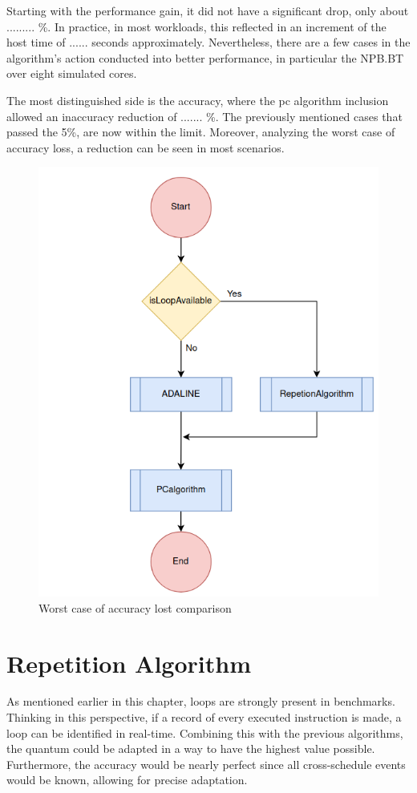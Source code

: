 Starting with the performance gain, it did not have a significant drop, only about  ......... \%. In practice, in most workloads, this 
reflected in an increment of the host time of ...... seconds approximately. Nevertheless, there are a few cases in the algorithm's action 
conducted into better performance, in particular the NPB.BT over eight simulated cores. 

The most distinguished side is the accuracy, where the \gls{pc} algorithm inclusion allowed an inaccuracy reduction of ....... \%. The 
previously mentioned cases that passed the 5\%, are now within the limit. Moreover, analyzing the worst case of accuracy loss, a reduction can be 
seen in most scenarios.  

\begin{figure}[H]
	\centering
 	\includegraphics[width=0.5\linewidth]{Images/ADA_and_REP.png}
 	\caption{Worst case of accuracy lost comparison}
	 \label{fig_WorstCase_PC}
\end{figure}



\section{Repetition Algorithm}

As mentioned earlier in this chapter, loops are strongly present in benchmarks. Thinking in this perspective, if a record of every executed 
instruction is made, a loop can be identified in real-time. Combining this with the previous algorithms, the quantum could be adapted in a way 
to have the highest value possible. Furthermore, the accuracy would be nearly perfect since all cross-schedule events would be known, allowing 
for precise adaptation.


